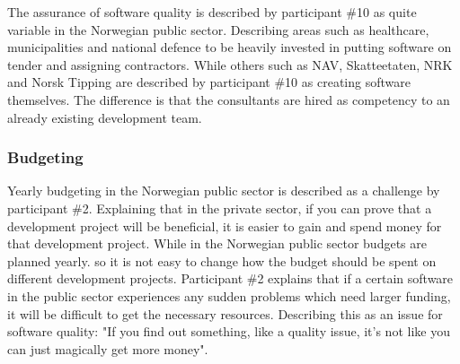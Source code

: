 
The assurance of software quality is described by participant \#10 as quite variable in the Norwegian public sector. Describing areas such as healthcare, municipalities and national defence to be heavily invested in putting software on tender and assigning contractors. While others such as NAV, Skatteetaten, NRK and Norsk Tipping are described by participant \#10 as creating software themselves. The difference is that the consultants are hired as competency to an already existing development team.


\subsubsection{Budgeting} \label{sec:budgeting}
Yearly budgeting in the Norwegian public sector is described as a challenge by participant \#2. Explaining that in the private sector, if you can prove that a development project will be beneficial, it is easier to gain and spend money for that development project. While in the Norwegian public sector budgets are planned yearly. so it is not easy to change how the budget should be spent on different development projects. Participant \#2 explains that if a certain software in the public sector experiences any sudden problems which need larger funding, it will be difficult to get the necessary resources. Describing this as an issue for software quality: "If you find out something, like a quality issue, it's not like you can just magically get more money".

